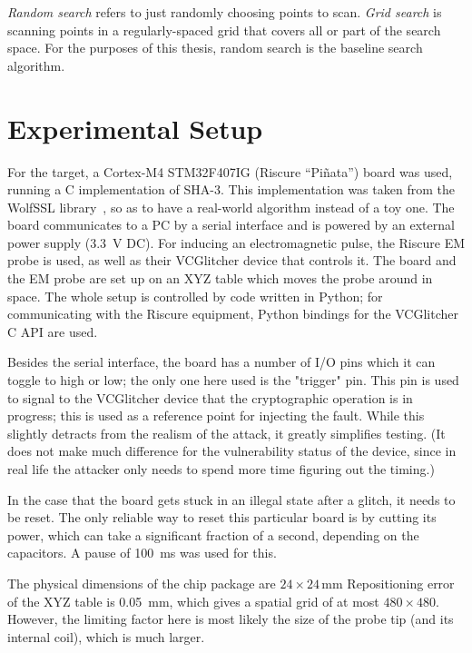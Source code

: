 \documentclass[times, utf8, diplomski]{fer}
\begin{document}
\emph{Random search} refers to just randomly choosing points to scan.
\emph{Grid search} is scanning points in a regularly-spaced grid that covers all
or part of the search space.
For the purposes of this thesis, random search is the baseline search algorithm.


\section{Experimental Setup}\label{sec:setup}
For the target, a Cortex-M4 STM32F407IG (Riscure ``Pi\~{n}ata'') board was used,
running a C implementation of SHA-3. This implementation was taken from the WolfSSL
library~\cite{WolfSSL}, so as to have a real-world algorithm instead of a toy one.
The board communicates to a PC by a serial interface and is powered by an external
power supply (\SI{3.3}{\volt} DC). For inducing an electromagnetic pulse, the
Riscure EM probe is used, as well as their VCGlitcher device that controls it.
The board and the EM probe are set up on an XYZ table which moves the probe
around in space. The whole setup is controlled by code written in Python; for
communicating with the Riscure equipment, Python bindings for the VCGlitcher
C API are used.\footnotemark


Besides the serial interface, the board has a number of I/O pins which it can
toggle to high or low; the only one here used is the "trigger" pin. This pin is
used to signal to the VCGlitcher device that the cryptographic operation is in
progress; this is used as a reference point for injecting the fault. While this
slightly detracts from the realism of the attack, it greatly simplifies testing.
(It does not make much difference for the vulnerability status of the device,
since in real life the attacker only needs to spend more time figuring out the
timing.)

In the case that the board gets stuck in an illegal state after a glitch, it
needs to be reset. The only reliable way to reset this particular board is by
cutting its power, which can take a significant fraction of a second, depending
on the capacitors. A pause of \SI{100}{\milli\second} was used for this.

The physical dimensions of the chip package are $24 \times 24$\,\si{\milli\metre}
Repositioning error of the XYZ table is \SI{0.05}{\milli\metre}, which gives
a spatial grid of at most $480 \times 480$. However, the limiting factor here
is most likely the size of the probe tip (and its internal coil), which is much
larger.
\end{document}
